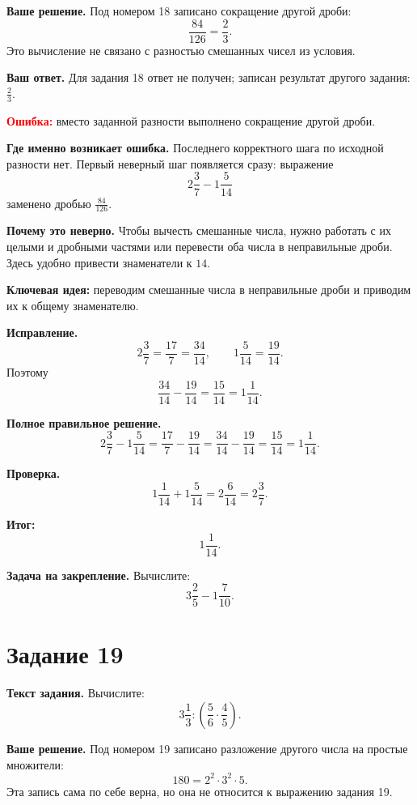\documentclass[12pt,a4paper]{article}
\begin{document}
\textbf{Ваше решение.}
Под номером 18 записано сокращение другой дроби:
\[
\frac{84}{126}=\frac23.
\]
Это вычисление не связано с разностью смешанных чисел из условия.

\textbf{Ваш ответ.}
Для задания 18 ответ не получен; записан результат другого задания: $\frac23$.

\textcolor{red}{\textbf{Ошибка:}} вместо заданной разности выполнено сокращение другой дроби.

\textbf{Где именно возникает ошибка.}
Последнего корректного шага по исходной разности нет.
Первый неверный шаг появляется сразу: выражение
\[
2\frac37-1\frac5{14}
\]
заменено дробью $\frac{84}{126}$.

\textbf{Почему это неверно.}
Чтобы вычесть смешанные числа, нужно работать с их целыми и дробными частями
или перевести оба числа в неправильные дроби. Здесь удобно привести знаменатели к $14$.

\textcolor{blue!60!black}{\textbf{Ключевая идея:}}
переводим смешанные числа в неправильные дроби и приводим их к общему знаменателю.

\textbf{Исправление.}
\[
2\frac37=\frac{17}{7}=\frac{34}{14},
\qquad
1\frac5{14}=\frac{19}{14}.
\]
Поэтому
\[
\frac{34}{14}-\frac{19}{14}=\frac{15}{14}=1\frac1{14}.
\]

\textbf{Полное правильное решение.}
\[
2\frac37-1\frac5{14}
=\frac{17}{7}-\frac{19}{14}
=\frac{34}{14}-\frac{19}{14}
=\frac{15}{14}
=1\frac1{14}.
\]

\textbf{Проверка.}
\[
1\frac1{14}+1\frac5{14}=2\frac6{14}=2\frac37.
\]

\textcolor{teal!60!black}{\textbf{Итог:}}
\[
\boxed{1\frac1{14}}.
\]

\textbf{Задача на закрепление.}
Вычислите:
\[
3\frac25-1\frac7{10}.
\]

\newpage
{}
\label{task:19}
\section*{Задание 19}

\textbf{Текст задания.}
Вычислите:
\[
3\frac13:\left(\frac56\cdot\frac45\right).
\]

\textbf{Ваше решение.}
Под номером 19 записано разложение другого числа на простые множители:
\[
180=2^2\cdot3^2\cdot5.
\]
Эта запись сама по себе верна, но она не относится к выражению задания 19.
\end{document}
